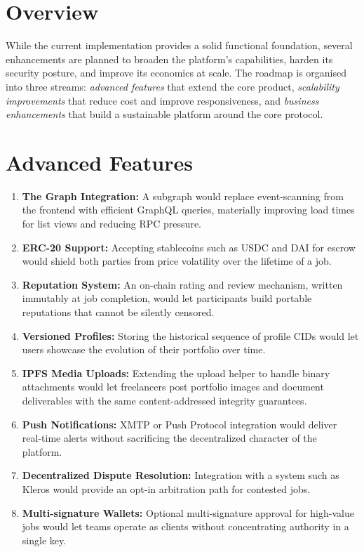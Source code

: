 \section{Overview}

While the current implementation provides a solid functional foundation, several enhancements are planned to broaden the platform's capabilities, harden its security posture, and improve its economics at scale. The roadmap is organised into three streams: \textit{advanced features} that extend the core product, \textit{scalability improvements} that reduce cost and improve responsiveness, and \textit{business enhancements} that build a sustainable platform around the core protocol.

\section{Advanced Features}

\begin{enumerate}
    \item \textbf{The Graph Integration:} A subgraph would replace event-scanning from the frontend with efficient GraphQL queries, materially improving load times for list views and reducing RPC pressure.
    \item \textbf{ERC-20 Support:} Accepting stablecoins such as USDC and DAI for escrow would shield both parties from price volatility over the lifetime of a job.
    \item \textbf{Reputation System:} An on-chain rating and review mechanism, written immutably at job completion, would let participants build portable reputations that cannot be silently censored.
    \item \textbf{Versioned Profiles:} Storing the historical sequence of profile CIDs would let users showcase the evolution of their portfolio over time.
    \item \textbf{IPFS Media Uploads:} Extending the upload helper to handle binary attachments would let freelancers post portfolio images and document deliverables with the same content-addressed integrity guarantees.
    \item \textbf{Push Notifications:} XMTP or Push Protocol integration would deliver real-time alerts without sacrificing the decentralized character of the platform.
    \item \textbf{Decentralized Dispute Resolution:} Integration with a system such as Kleros would provide an opt-in arbitration path for contested jobs.
    \item \textbf{Multi-signature Wallets:} Optional multi-signature approval for high-value jobs would let teams operate as clients without concentrating authority in a single key.
\end{enumerate}

